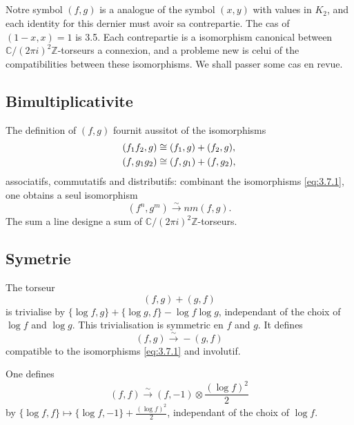 \documentclass[12pt,a4paper]{article}
\theoremstyle{plain}
\theoremstyle{definition}
\theoremstyle{remark}
\newcommand{\Z}{\mathbb{Z}}
\newcommand{\C}{\mathbb{C}}
\begin{document}
\subsection{}

Notre symbol $(f,g)$ is a analogue of the symbol $(x,y)$ with values in $K_2$,
and each identity for this dernier must avoir sa contrepartie. The cas of $(1-x, x) = 1$
is 3.5. Each contrepartie is a isomorphism canonical between $\C/(2\pi i)^2\Z$-torseurs
a connexion, and a probleme new is celui of the compatibilities between these isomorphisms.
We shall passer some cas en revue.

\subsection{Bimultiplicativite}

The definition of $(f,g)$ fournit aussitot of the isomorphisms
\begin{align}
(f_1 f_2, g) &\cong (f_1, g) + (f_2, g), \label{eq:3.7.1} \\
(f, g_1 g_2) &\cong (f, g_1) + (f, g_2), \notag
\end{align}
associatifs, commutatifs and distributifs: combinant the isomorphisms \eqref{eq:3.7.1}, one obtains
a seul isomorphism
\[
(f^n, g^m) \xrightarrow{\sim} nm(f, g).
\]
The sum a line designe a sum of $\C/(2\pi i)^2\Z$-torseurs.

\subsection{Symetrie}

The torseur
\begin{equation}\label{eq:3.8.1}
(f,g) + (g,f)
\end{equation}
is trivialise by $\{\log f, g\} + \{\log g, f\} - \log f \log g$, independant of the choix of $\log f$
and $\log g$. This trivialisation is symmetric en $f$ and $g$. It defines
\begin{equation}\label{eq:3.8.2}
(f,g) \xrightarrow{\sim} -(g,f)
\end{equation}
compatible to the isomorphisms \eqref{eq:3.7.1} and involutif.

One defines
\begin{equation}\label{eq:3.8.3}
(f,f) \xrightarrow{\sim} (f, -1) \otimes \frac{(\log f)^2}{2}
\end{equation}
by $\{\log f, f\} \mapsto \{\log f, -1\} + \frac{(\log f)^2}{2}$, independant of the choix of $\log f$.
\end{document}
